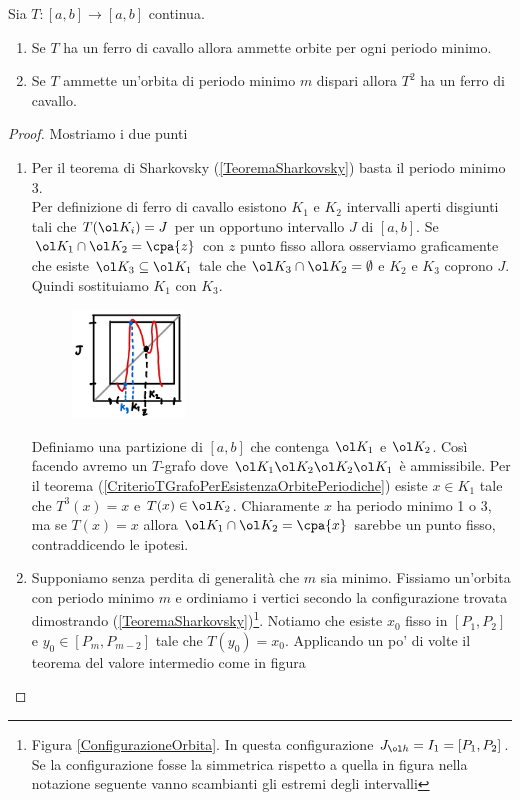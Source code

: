 \begin{proposition}\label{RelazioneFerroDiCavalloEPeriodiMinimi}
Sia $T:[a,b]\to[a,b]$ continua.
\begin{enumerate}
\item Se $T$ ha un ferro di cavallo allora ammette orbite per ogni periodo minimo.
\item Se $T$ ammette un'orbita di periodo minimo $m$ dispari allora $T^2$ ha un ferro di cavallo. 
\end{enumerate}
\end{proposition}
\begin{proof}
Mostriamo i due punti
\setlength{\leftmargini}{0cm}
\begin{enumerate}
\item Per il teorema di Sharkovsky (\ref{TeoremaSharkovsky}) basta il periodo minimo 3.\\ 
Per definizione di ferro di cavallo esistono $K_1$ e $K_2$ intervalli aperti disgiunti tali che $T(\ol K_i)=J$ per un opportuno intervallo $J$ di $[a,b]$. Se $\ol K_1\cap \ol K_2=\cpa{z}$ con $z$ punto fisso allora osserviamo graficamente che esiste $\ol K_3\subseteq \ol K_1$ tale che $\ol K_3\cap \ol K_2=\emptyset$ e $K_2$ e $K_3$ coprono $J$. Quindi sostituiamo $K_1$ con $K_3$.

\begin{figure}[!htb]
	\centering
	\includegraphics[width=3cm]{Immagini/esempio_Dimostrazione_ferro_di_cavallo.png}
\end{figure}

Definiamo una partizione di $[a,b]$ che contenga $\ol K_1$ e $\ol K_2$. Cos\`i facendo avremo un $T$-grafo dove $\ol K_1\ol K_2\ol K_2\ol K_1$ \`e ammissibile. Per il teorema (\ref{CriterioTGrafoPerEsistenzaOrbitePeriodiche}) esiste $x\in K_1$ tale che $T^3(x)=x$ e $T(x)\in \ol K_2$. Chiaramente $x$ ha periodo minimo 1 o 3, ma se $T(x)=x$ allora $\ol K_1\cap \ol K_2=\cpa{x}$ sarebbe un punto fisso, contraddicendo le ipotesi.
\item Supponiamo senza perdita di generalit\`a che $m$ sia minimo. Fissiamo un'orbita con periodo minimo $m$ e ordiniamo i vertici secondo la configurazione trovata dimostrando (\ref{TeoremaSharkovsky})\footnote{Figura \ref{ConfigurazioneOrbita}. In questa configurazione $J_{\ol h}=I_1=[P_1,P_2]$. Se la configurazione fosse la simmetrica rispetto a quella in figura nella notazione seguente vanno scambianti gli estremi degli intervalli }. Notiamo che esiste $x_0$ fisso in $[P_1,P_2]$ e $y_0\in [P_{m},P_{m-2}]$ tale che $T(y_0)=x_0$. Applicando un po' di volte il teorema del valore intermedio come in figura 


\end{enumerate}
\end{proof}

